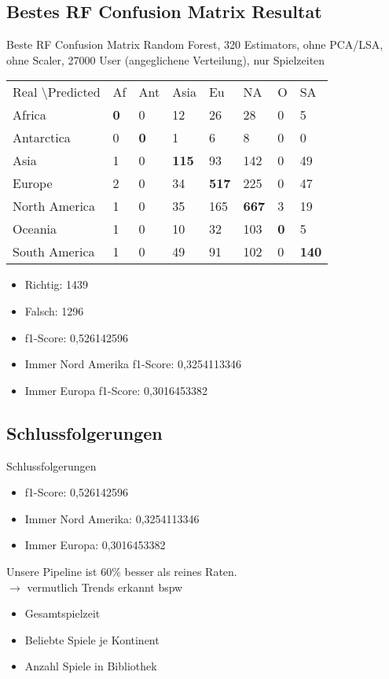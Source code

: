 \documentclass[10pt,a4paper]{beamer}
\begin{document}
\subsection{Bestes RF Confusion Matrix Resultat}
\begin{frame}[fragile]{Beste RF Confusion Matrix}
Random Forest, 320 Estimators, ohne PCA/LSA, ohne Scaler, 27000 User (angeglichene Verteilung), nur Spielzeiten \\
\medskip
\begin{tabular}{| l| l| l| l| l| l| l| l|}
\hline
Real \textbackslash Predicted & Af & Ant & Asia & Eu & NA & O & SA \\
Africa & \textbf{0} & 0 & 12 & 26 & 28 & 0 & 5 \\
Antarctica & 0 & \textbf{0} & 1 & 6 & 8 & 0 & 0 \\
Asia & 1 & 0 & \textbf{115} & 93 & 142 & 0 & 49 \\
Europe & 2 & 0 & 34 & \textbf{517} & 225 & 0 & 47 \\
North America & 1 & 0 & 35 & 165 & \textbf{667} & 3 & 19 \\
Oceania & 1 & 0 & 10 & 32 & 103 & \textbf{0} & 5 \\
South America & 1 & 0 & 49 & 91 & 102 & 0 & \textbf{140} \\
\hline
\end{tabular}
\begin{itemize}
\item Richtig: 1439
\item Falsch: 1296
\item f1-Score: 0,526142596
\item Immer Nord Amerika f1-Score: 0,3254113346
\item Immer Europa f1-Score: 0,3016453382
\end{itemize}
\end{frame}

\subsection{Schlussfolgerungen}
\begin{frame}[fragile]{Schlussfolgerungen}
\begin{itemize}
\item f1-Score: 0,526142596
\item Immer Nord Amerika: 0,3254113346
\item Immer Europa: 0,3016453382
\end{itemize}
Unsere Pipeline ist 60\% besser als reines Raten. \\
$ \rightarrow $ vermutlich Trends erkannt bspw
\begin{itemize}
\item Gesamtspielzeit
\item Beliebte Spiele je Kontinent
\item Anzahl Spiele in Bibliothek
\end{itemize}  

\end{frame}
\end{document}
